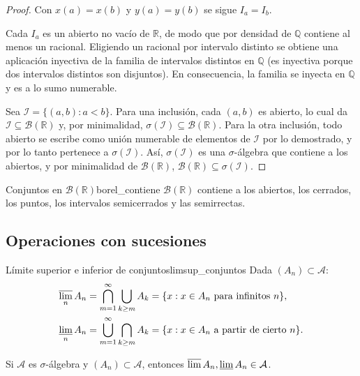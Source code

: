 \documentclass[11pt, a4paper]{article}
\begin{document}
\begin{proof}
Con $x(a) = x(b)$ y $y(a) = y(b)$ se sigue $I_a = I_b$.

Cada $I_a$ es un abierto no vacío de $\mathbb{R}$, de modo que por
densidad de $\mathbb{Q}$ contiene al menos un racional. Eligiendo un racional por intervalo
distinto se obtiene una aplicación inyectiva de la familia de intervalos distintos en
$\mathbb{Q}$ (es inyectiva porque dos intervalos distintos son disjuntos). En consecuencia, la
familia se inyecta en $\mathbb{Q}$ y es a lo sumo numerable.

Sea $\mathcal{I} = \{(a, b)
: a < b\}$. Para una inclusión, cada $(a, b)$ es abierto, lo cual da $\mathcal{I} \subseteq
\mathcal{B}(\mathbb{R})$ y, por minimalidad, $\sigma(\mathcal{I}) \subseteq
\mathcal{B}(\mathbb{R})$.
Para la otra inclusión, todo abierto se escribe como unión numerable de elementos de
$\mathcal{I}$ por lo demostrado, y por lo tanto pertenece a $\sigma(\mathcal{I})$. Así,
$\sigma(\mathcal{I})$ es una $\sigma$-álgebra que contiene a los abiertos, y por minimalidad de
$\mathcal{B}(\mathbb{R})$, $\mathcal{B}(\mathbb{R}) \subseteq \sigma(\mathcal{I})$.
\end{proof}

\begin{corolario}{Conjuntos en $\mathcal{B}(\mathbb{R})$}{borel_contiene}
$\mathcal{B}(\mathbb{R})$ contiene a los abiertos, los cerrados, los puntos, los intervalos
semicerrados y las semirrectas.
\end{corolario}
 
\subsection{Operaciones con sucesiones}

\begin{definicion}{Límite superior e inferior de conjuntos}{limsup_conjuntos}
Dada $(A_n) \subset \mathcal{A}$:
\begin{align*}
\varlimsup_n A_n &= \bigcap_{m=1}^\infty \bigcup_{k \ge m} A_k = \{x : x \in A_n \text{ para
infinitos } n\}, \\
\varliminf_n A_n &= \bigcup_{m=1}^\infty \bigcap_{k \ge m} A_k = \{x : x \in A_n \text{ a partir de
cierto } n\}.
\end{align*}
\end{definicion}

\obs Si $\mathcal{A}$ es $\sigma$-álgebra y $(A_n) \subset \mathcal{A}$, entonces
$\varlimsup A_n, \varliminf A_n \in \mathcal{A}$.
\end{document}
